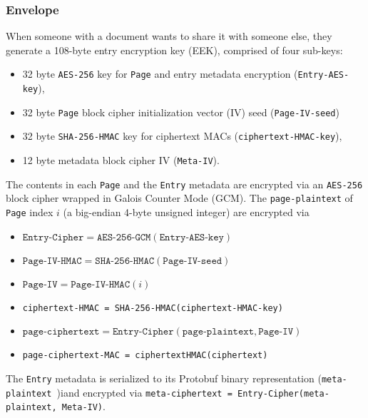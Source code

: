 \documentclass[10pt]{article}
\def\Entry{\texttt{Entry}}
\def\Page{\texttt{Page}}
\begin{document}
\subsubsection{Envelope}
When someone with a document wants to share it with someone else, they generate a 108-byte entry encryption key (EEK), comprised of four sub-keys:
\begin{itemize}
	\item 32 byte \texttt{AES-256} key for \Page{} and entry metadata encryption (\texttt{Entry-AES-key}),
	\item 32 byte \Page{} block cipher initialization vector (IV) seed (\texttt{Page-IV-seed})
	\item 32 byte \texttt{SHA-256-HMAC} key for ciphertext MACs (\texttt{ciphertext-HMAC-key}),
	\item 12 byte metadata block cipher IV (\texttt{Meta-IV}).
\end{itemize}

The contents in each \Page{} and the \Entry{} metadata are encrypted via an \texttt{AES-256} block cipher wrapped in Galois Counter Mode (GCM). The \texttt{page-plaintext} of \Page{} index $i$ (a big-endian 4-byte unsigned integer) are encrypted via
\begin{itemize}
	\item $\texttt{Entry-Cipher} = \texttt{AES-256-GCM}(\texttt{Entry-AES-key})$
	\item $\texttt{Page-IV-HMAC} = \texttt{SHA-256-HMAC}(\texttt{Page-IV-seed})$
	\item $\texttt{Page-IV} = \texttt{Page-IV-HMAC}(i)$
	\item \texttt{ciphertext-HMAC = SHA-256-HMAC(ciphertext-HMAC-key)}
	\item $\texttt{page-ciphertext} = \texttt{Entry-Cipher}(\texttt{page-plaintext}, \texttt{Page-IV})$
	\item \texttt{page-ciphertext-MAC = ciphertextHMAC(ciphertext)}
\end{itemize}

The \Entry{} metadata is serialized to its Protobuf binary representation (\texttt{meta-plaintext })iand encrypted via \texttt{meta-ciphertext = Entry-Cipher(meta-plaintext, Meta-IV)}. 
\end{document}
